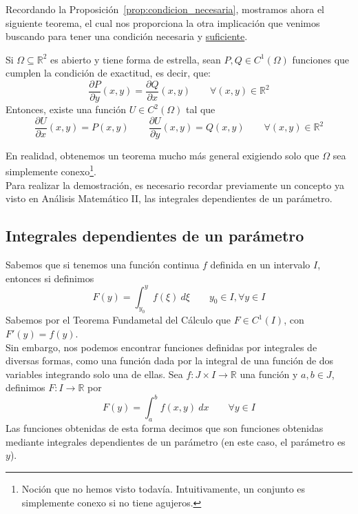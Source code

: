 Recordando la Proposición~\ref{prop:condicion_necesaria}, mostramos ahora el siguiente teorema, el cual nos proporciona la otra implicación que venimos buscando para tener una condición necesaria y \underline{suficiente}.
\begin{teo}\label{teo:condicion_suficiente}
    Si $\Omega\subseteq \mathbb{R}^2$ es abierto y tiene forma de estrella, sean $P,Q\in C^1(\Omega)$ funciones que cumplen la condición de exactitud, es decir, que:
    \begin{equation*}
        \dfrac{\partial P}{\partial y}(x,y) = \dfrac{\partial Q}{\partial x}(x,y) \qquad \forall (x,y)\in \mathbb{R}^2
    \end{equation*}
    Entonces, existe una función $U\in C^2(\Omega)$ tal que 
    \begin{equation*}
        \dfrac{\partial U}{\partial x}(x,y) = P(x,y) \qquad \dfrac{\partial U}{\partial y}(x,y) = Q(x,y) \qquad \forall (x,y)\in \mathbb{R}^2
    \end{equation*}
\end{teo}
\noindent
En realidad, obtenemos un teorema mucho más general exigiendo solo que $\Omega$ sea simplemente conexo\footnote{Noción que no hemos visto todavía. Intuitivamente, un conjunto es simplemente conexo si no tiene agujeros.}.\\

Para realizar la demostración, es necesario recordar previamente un concepto ya visto en Análisis Matemático II\@, las integrales dependientes de un parámetro.
\subsection{Integrales dependientes de un parámetro}
Sabemos que si tenemos una función continua $f$ definida en un intervalo $I$, entonces si definimos
\begin{equation*}
    F(y) = \int_{y_0}^{y} f(\xi)~d\xi  \qquad y_0\in I, \forall y\in I
\end{equation*}
Sabemos por el Teorema Fundametal del Cálculo que $F\in C^1(I)$, con $F'(y) = f(y)$.\\

Sin embargo, nos podemos encontrar funciones definidas por integrales de diversas formas, como una función dada por la integral de una función de dos variables integrando solo una de ellas. Sea $f:J\times I\rightarrow\mathbb{R}$ una función y $a,b\in J$, definimos $F:I\rightarrow\mathbb{R}$ por
\begin{equation*}
    F(y) = \int_{a}^{b} f(x,y)~dx  \qquad \forall y\in I
\end{equation*}
Las funciones obtenidas de esta forma decimos que son funciones obtenidas mediante integrales dependientes de un parámetro (en este caso, el parámetro es $y$).\\

